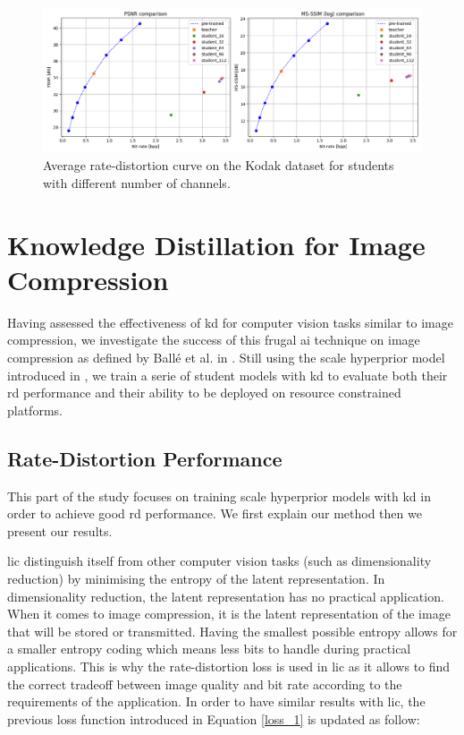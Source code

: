 \begin{figure}
    \centering
    \includegraphics[width=15cm]{img/kd_ae_rd.png}
    \caption[Average rate-distortion curve on the Kodak dataset for students with different number of channels.]{Average rate-distortion curve on the Kodak dataset for students with different number of channels.}
    \label{kd_ae_2}
\end{figure}

\section{Knowledge Distillation for Image Compression}
Having assessed the effectiveness of \acrshort{kd} for computer vision tasks similar to image compression, we investigate the success of this frugal \acrshort{ai} technique on image compression as defined by Ballé et al. in \cite{ballé2016endtoendoptimizationnonlineartransform}. Still using the scale hyperprior model introduced in \cite{ballé2018variationalimagecompressionscale}, we train a serie of student models with \acrshort{kd} to evaluate both their \acrshort{rd} performance and their ability to be deployed on resource constrained platforms.

\subsection{Rate-Distortion Performance}
This part of the study focuses on training scale hyperprior models with \acrshort{kd} in order to achieve good \acrshort{rd} performance. We first explain our method then we present our results.

\acrshort{lic} distinguish itself from other computer vision tasks (such as dimensionality reduction) by minimising the entropy of the latent representation. In dimensionality reduction, the latent representation has no practical application. When it comes to image compression, it is the latent representation of the image that will be stored or transmitted. Having the smallest possible entropy allows for a smaller entropy coding which means less bits to handle during practical applications. This is why the rate-distortion loss is used in \acrshort{lic} as it allows to find the correct tradeoff between image quality and bit rate according to the requirements of the application. In order to have similar results with \acrshort{lic}, the previous loss function introduced in Equation \eqref{loss_1} is updated as follow:

